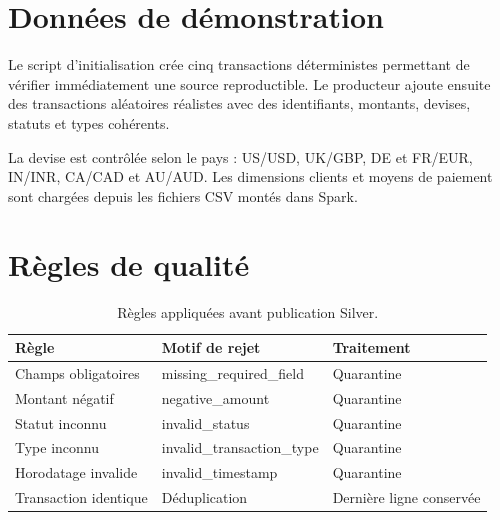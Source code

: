 \documentclass[11pt,a4paper]{report}
\begin{document}
\section{Données de démonstration}
Le script d'initialisation crée cinq transactions déterministes permettant
de vérifier immédiatement une source reproductible. Le producteur ajoute
ensuite des transactions aléatoires réalistes avec des identifiants,
montants, devises, statuts et types cohérents.

La devise est contrôlée selon le pays : US/USD, UK/GBP, DE et FR/EUR,
IN/INR, CA/CAD et AU/AUD. Les dimensions clients et moyens de paiement
sont chargées depuis les fichiers CSV montés dans Spark.

\section{Règles de qualité}
\begin{table}[H]
\centering
\begin{tabularx}{\textwidth}{l Y Y}
\toprule
\textbf{Règle} & \textbf{Motif de rejet} & \textbf{Traitement}\\
\midrule
Champs obligatoires & missing\_required\_field & Quarantine\\
Montant négatif & negative\_amount & Quarantine\\
Statut inconnu & invalid\_status & Quarantine\\
Type inconnu & invalid\_transaction\_type & Quarantine\\
Horodatage invalide & invalid\_timestamp & Quarantine\\
Transaction identique & Déduplication & Dernière ligne conservée\\
\bottomrule
\end{tabularx}
\caption{Règles appliquées avant publication Silver.}
\end{table}
\end{document}
